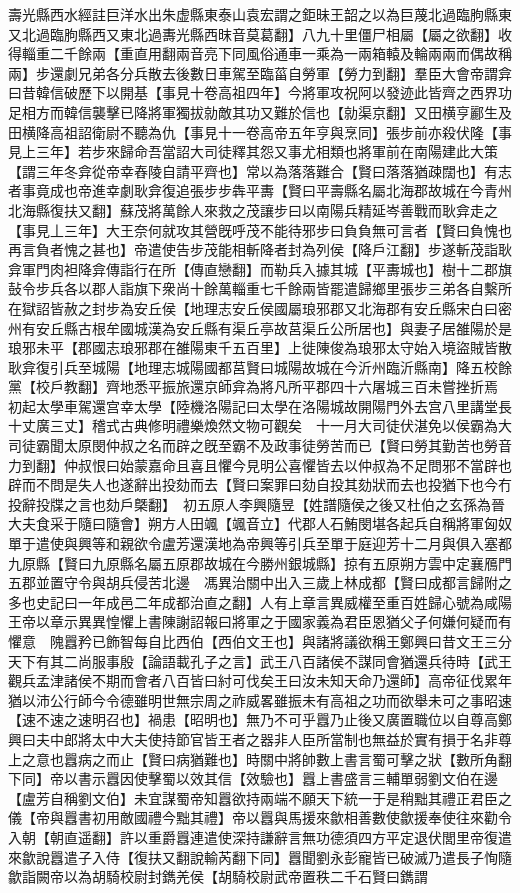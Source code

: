 壽光縣西水經註巨洋水出朱虚縣東泰山袁宏謂之鉅昧王韶之以為巨蔑北過臨朐縣東又北過臨朐縣西又東北過夀光縣西昩音莫葛翻】八九十里僵尸相屬【屬之欲翻】收得輜重二千餘兩【重直用翻兩音亮下同風俗通車一乘為一兩箱轅及輪兩兩而偶故稱兩】步還劇兄弟各分兵散去後數日車駕至臨菑自勞軍【勞力到翻】羣臣大會帝謂弇曰昔韓信破歷下以開基【事見十卷高祖四年】今將軍攻祝阿以發迹此皆齊之西界功足相方而韓信襲擊已降將軍獨拔勍敵其功又難於信也【勍渠京翻】又田横亨酈生及田横降高祖詔衛尉不聽為仇【事見十一卷高帝五年亨與烹同】張步前亦殺伏隆【事見上三年】若步來歸命吾當詔大司徒釋其怨又事尤相類也將軍前在南陽建此大策【謂三年冬弇從帝幸舂陵自請平齊也】常以為落落難合【賢曰落落猶疎闊也】有志者事竟成也帝進幸劇耿弇復追張步步犇平夀【賢曰平壽縣名屬北海郡故城在今青州北海縣復扶又翻】蘇茂將萬餘人來救之茂讓步曰以南陽兵精延岑善戰而耿弇走之【事見丄三年】大王奈何就攻其營旣呼茂不能待邪步曰負負無可言者【賢曰負愧也再言負者愧之甚也】帝遣使告步茂能相斬降者封為列侯【降戶江翻】步遂斬茂詣耿弇軍門肉袒降弇傳詣行在所【傳直戀翻】而勒兵入據其城【平夀城也】樹十二郡旗鼔令步兵各以郡人詣旗下衆尚十餘萬輜重七千餘兩皆罷遣歸鄉里張步三弟各自繫所在獄詔皆赦之封步為安丘侯【地理志安丘侯國屬琅邪郡又北海郡有安丘縣宋白曰密州有安丘縣古根牟國城漢為安丘縣有渠丘亭故莒渠丘公所居也】與妻子居雒陽於是琅邪未平【郡國志琅邪郡在雒陽東千五百里】上徙陳俊為琅邪太守始入境盜賊皆散耿弇復引兵至城陽【地理志城陽國都莒賢曰城陽故城在今沂州臨沂縣南】降五校餘黨【校戶教翻】齊地悉平振旅還京師弇為將凡所平郡四十六屠城三百未嘗挫折焉　初起太學車駕還宫幸太學【陸機洛陽記曰太學在洛陽城故開陽門外去宫八里講堂長十丈廣三丈】稽式古典修明禮樂煥然文物可觀矣　十一月大司徒伏湛免以侯霸為大司徒霸聞太原閔仲叔之名而辟之旣至霸不及政事徒勞苦而已【賢曰勞其勤苦也勞音力到翻】仲叔恨曰始蒙嘉命且喜且懼今見明公喜懼皆去以仲叔為不足問邪不當辟也辟而不問是失人也遂辭出投劾而去【賢曰案罪曰劾自投其劾狀而去也投猶下也今冇投辭投牒之言也劾戶槩翻】　初五原人李興隨昱【姓譜隨侯之後又杜伯之玄孫為晉大夫食采于隨曰隨會】朔方人田颯【颯音立】代郡人石鮪閔堪各起兵自稱將軍匈奴單于遣使與興等和親欲令盧芳還漢地為帝興等引兵至單于庭迎芳十二月與俱入塞都九原縣【賢曰九原縣名屬五原郡故城在今勝州銀城縣】掠有五原朔方雲中定襄鴈門五郡並置守令與胡兵侵苦北邊　馮異治關中出入三歲上林成都【賢曰成都言歸附之多也史記曰一年成邑二年成都治直之翻】人有上章言異威權至重百姓歸心號為咸陽王帝以章示異異惶懼上書陳謝詔報曰將軍之于國家義為君臣恩猶父子何嫌何疑而有懼意　隗囂矜已飾智每自比西伯【西伯文王也】與諸將議欲稱王鄭興曰昔文王三分天下有其二尚服事殷【論語載孔子之言】武王八百諸侯不謀同會猶還兵待時【武王觀兵孟津諸侯不期而會者八百皆曰紂可伐矣王曰汝未知天命乃還師】高帝征伐累年猶以沛公行師今令德雖明世無宗周之祚威畧雖振未有高祖之功而欲舉未可之事昭速【速不速之速明召也】禍患【昭明也】無乃不可乎囂乃止後又廣置職位以自尊高鄭興曰夫中郎將太中大夫使持節官皆王者之器非人臣所當制也無益於實有損于名非尊上之意也囂病之而止【賢曰病猶難也】時關中將帥數上書言蜀可擊之狀【數所角翻下同】帝以書示囂因使擊蜀以效其信【效驗也】囂上書盛言三輔單弱劉文伯在邊【盧芳自稱劉文伯】未宜謀蜀帝知囂欲持兩端不願天下統一于是稍黜其禮正君臣之儀【帝與囂書初用敵國禮今黜其禮】帝以囂與馬援來歙相善數使歙援奉使往來勸令入朝【朝直遥翻】許以重爵囂連遣使深持謙辭言無功德須四方平定退伏閭里帝復遣來歙說囂遣子入侍【復扶又翻說輸芮翻下同】囂聞劉永彭寵皆已破滅乃遣長子恂隨歙詣闕帝以為胡騎校尉封鐫羌侯【胡騎校尉武帝置秩二千石賢曰鐫謂